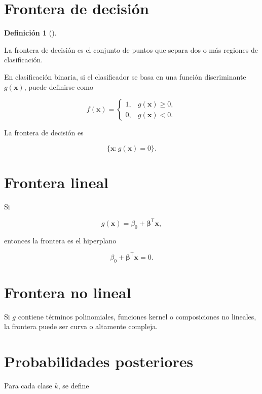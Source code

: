 \documentclass[
  spanish,
  11pt,
  letterpaper,
  DIV=11,
  numbers=noendperiod]{scrreprt}
\theoremstyle{definition}
\newtheorem{definition}{Definición}[chapter]
\theoremstyle{plain}
\theoremstyle{definition}
\theoremstyle{remark}
\begin{document}
\section{Frontera de decisión}\label{frontera-de-decisiuxf3n}

\begin{definition}[]\protect\hypertarget{def-frontera-decision}{}\label{def-frontera-decision}

La frontera de decisión es el conjunto de puntos que separa dos o más
regiones de clasificación.

\end{definition}

En clasificación binaria, si el clasificador se basa en una función
discriminante \(g(\mathbf{x})\), puede definirse como

\[
f(\mathbf{x})
=
\begin{cases}
1, & g(\mathbf{x})\geq 0,\\
0, & g(\mathbf{x})<0.
\end{cases}
\]

La frontera de decisión es

\[
\{
\mathbf{x}:g(\mathbf{x})=0
\}.
\]

\section{Frontera lineal}\label{frontera-lineal}

Si

\[
g(\mathbf{x})
=
\beta_0
+
\boldsymbol{\beta}^{\mathsf T}\mathbf{x},
\]

entonces la frontera es el hiperplano

\[
\beta_0
+
\boldsymbol{\beta}^{\mathsf T}\mathbf{x}
=
0.
\]

\section{Frontera no lineal}\label{frontera-no-lineal}

Si \(g\) contiene términos polinomiales, funciones kernel o
composiciones no lineales, la frontera puede ser curva o altamente
compleja.

\section{Probabilidades posteriores}\label{probabilidades-posteriores}

Para cada clase \(k\), se define
\end{document}
